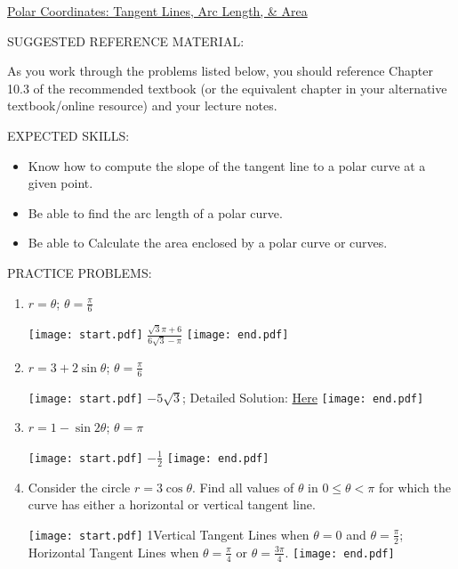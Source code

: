 \documentclass[12pt]{article}
\begin{document}
\begin{center}
\underline{\LARGE{Polar Coordinates: Tangent Lines, Arc Length, \& Area}}
\end{center}

\noindent SUGGESTED REFERENCE MATERIAL:

\bigskip

\noindent As you work through the problems listed below, you should reference Chapter 10.3 of the recommended textbook (or the equivalent chapter in your alternative textbook/online resource) and your lecture notes.

\bigskip

\noindent EXPECTED SKILLS:

\begin{itemize}

\item Know how to compute the slope of the tangent line to a polar curve at a given point. 

\item Be able to find the arc length of a polar curve.

\item Be able to Calculate the area enclosed by a polar curve or curves.

\end{itemize}

\noindent PRACTICE PROBLEMS:

\medskip


\begin{enumerate}

\item $r=\theta$; $\theta=\frac{\pi}{6}$ 

\texttt{[image: start.pdf]}
{{$\frac{\sqrt{3}\pi+6}{6\sqrt{3}-\pi}$}}
\texttt{[image: end.pdf]}


\item $r=3+2\sin{\theta}$; $\theta=\frac{\pi}{6}$ 

\texttt{[image: start.pdf]}
{{$-5\sqrt{3}$; Detailed Solution: \textcolor{blue}{\href{http://www.math.drexel.edu/classes/Calculus/resources/Math122HW/Solutions/122_19_Polar_Calc_02.pdf}{Here}}}}
\texttt{[image: end.pdf]}


\item $r=1-\sin{2\theta}$; $\theta = \pi$ 

\texttt{[image: start.pdf]}
{{$-\frac{1}{2}$}}
\texttt{[image: end.pdf]}


\item Consider the circle $r=3\cos{\theta}$.  Find all values of $\theta$ in $0 \leq \theta < \pi$ for which the curve has either a horizontal or vertical tangent line.

\texttt{[image: start.pdf]}
{{{1\linewidth}{Vertical Tangent Lines when $\theta=0$ and $\theta=\frac{\pi}{2}$;\\ Horizontal Tangent Lines when $\theta=\frac{\pi}{4}$ or $\theta=\frac{3\pi}{4}$.}}}
\texttt{[image: end.pdf]}


\end{enumerate}
\end{document}
